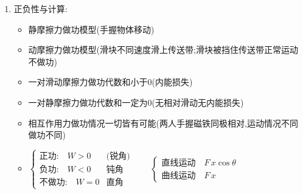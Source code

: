 \documentclass{article}
\begin{document}
\begin{itemize}
\begin{enumerate}
\begin{enumerate}
                            \vspace{-1em}

                      \item 正负性与计算:

                            \vspace{-1em}

                            \hspace{-1em}\begin{adjustbox}{minipage=0.9\linewidth, bgcolor=gray!20, padding=1em}
                                \small %
                                \begin{itemize}
                                    \item[] 静摩擦力做功模型(手握物体移动)
                                    \item[] 动摩擦力做功模型(滑块不同速度滑上传送带;滑块被挡住传送带正常运动不做功)
                                    \item[] 一对滑动摩擦力做功代数和小于0(内能损失)
                                    \item[] 一对静摩擦力做功代数和一定为$0$(无相对滑动无内能损失)
                                    \item[] 相互作用力做功情况一切皆有可能(两人手握磁铁同极相对,运动情况不同做功不同)
                                \end{itemize}
                            \end{adjustbox}

                            \begin{flushleft}   %
                                \begin{itemize}
                                    \item[]
                                        $
                                            \begin{cases}
                                                \text{正功:} \quad W > 0  & \text{(锐角)} \\
                                                \text{负功:} \quad W < 0  & \text{钝角}   \\
                                                \text{不做功:} \quad W = 0 & \text{直角}
                                            \end{cases}
                                            \hspace{2em}
                                            \begin{cases}
                                                \text{直线运动} \quad F\,x\cos{\theta} \\
                                                \text{曲线运动} \quad F\,x
                                            \end{cases}
                                        $
                                \end{itemize}
                            \end{flushleft}
                  \end{enumerate}


\end{enumerate}
\end{itemize}
\end{document}

